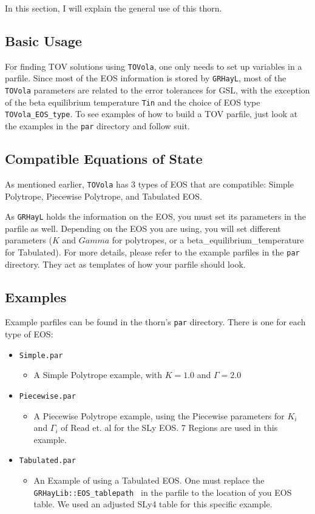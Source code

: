 In this section, I will explain the general use of this thorn. 

\subsection{Basic Usage}

For finding TOV solutions using {\tt TOVola}, one only needs to set up variables in a parfile. Since most of the EOS information is stored by {\tt GRHayL}, most of the {\tt TOVola} parameters are related to the error tolerances for GSL, with the exception of the beta equilibrium temperature {\tt Tin} and the choice of EOS type {\tt TOVola\_EOS\_type}. To see examples of how to build a TOV parfile, just look at the examples in the {\tt par} directory and follow suit.

\subsection{Compatible Equations of State}

As mentioned earlier, {\tt TOVola} has 3 types of EOS that are compatible: Simple Polytrope, Piecewise Polytrope, and Tabulated EOS.

As {\tt GRHayL}\cite{GRHayL} holds the information on the EOS, you must set its parameters in the parfile as well. Depending on the EOS you are using, you will set different parameters ($K$ and $Gamma$ for polytropes, or a beta\_equilibrium\_temperature for Tabulated). For more details, please refer to the example parfiles in the {\tt par} directory. They act as templates of how your parfile should look.

\subsection{Examples}

Example parfiles can be found in the thorn's {\tt par} directory. There is one for each type of EOS:

\begin{itemize}
    \item {\tt Simple.par }
    \begin{itemize}
    \item A Simple Polytrope example, with $K=1.0$ and $\Gamma=2.0$
    \end{itemize}
    \item {\tt Piecewise.par }
    \begin{itemize}
    \item A Piecewise Polytrope example, using the Piecewise parameters for $K_i$ and $\Gamma_i$ of Read et. al for the SLy EOS.\cite{Read} 7 Regions are used in this example.
    \end{itemize}
    \item {\tt Tabulated.par }
    \begin{itemize}
    \item An Example of using a Tabulated EOS. One must replace the {\tt GRHayLib::EOS\_tablepath } in the parfile to the location of you EOS table. We used an adjusted SLy4 table for this specific example.
    \end{itemize}
\end{itemize}

